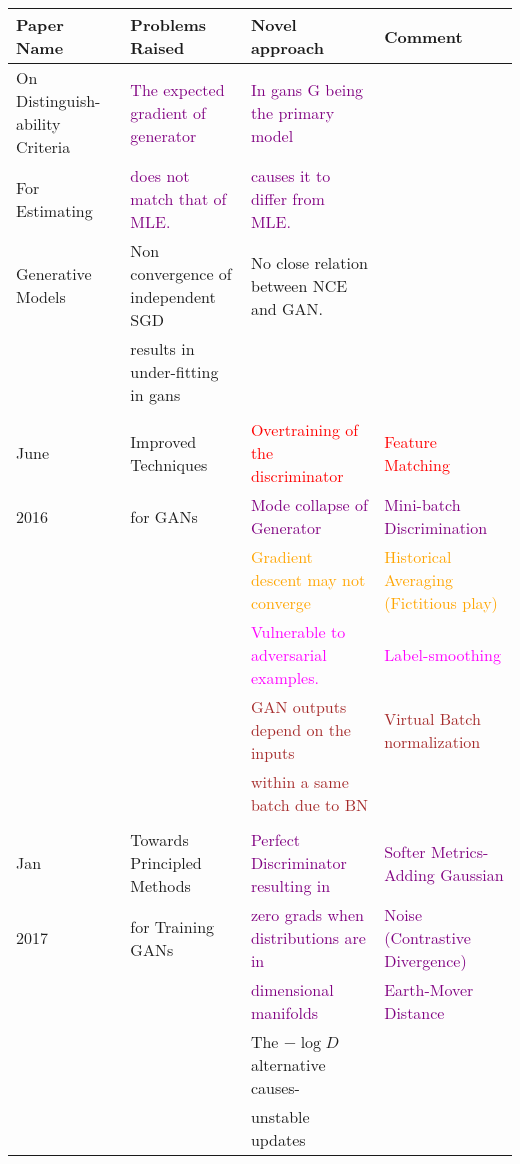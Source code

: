 \centering
\begin{adjustbox}{max width = 9cm}
\label{tab:2}
\begin{tabular}{|l|l|l|l|}
\hline 
 \textbf{Paper Name }& \textbf{Problems Raised} & \textbf{Novel approach} & \textbf{Comment} \\\hline
On Distinguish-ability Criteria & \textcolor{purple}{ The expected gradient of generator}  & \textcolor{purple}{In gans G being the primary model} &  \\
   For Estimating& \textcolor{purple}{does not  match that of MLE.}&\textcolor{purple}{causes it to differ from MLE.}& \\
Generative Models \cite{2014Goodfellow} & Non convergence of independent SGD& No close relation between NCE and GAN.& \\
&results in under-fitting in gans& &\\
&&& \\
June & Improved Techniques  & \textcolor{red}{Overtraining of the discriminator}  & \textcolor{red}{Feature Matching}  \\
2016 &for GANs \cite{goodfellow16} &\textcolor{purple}{Mode collapse of Generator} & \textcolor{purple}{Mini-batch Discrimination} \\
&& \textcolor{orange}{Gradient descent may not converge} & \textcolor{orange}{Historical Averaging (Fictitious play)}\\
& & \textcolor{magenta}{Vulnerable to adversarial examples.} & \textcolor{magenta}{Label-smoothing} \\
&&\textcolor{brown}{GAN outputs depend on the inputs} & \textcolor{brown}{Virtual Batch normalization} \\
&& \textcolor{brown}{within a same batch due to BN} &\\
& & & \\
Jan& Towards Principled Methods & \textcolor{purple}{Perfect Discriminator resulting in} & \textcolor{purple}{Softer Metrics- Adding Gaussian}\\
2017 &for Training GANs \cite{arjovsky01} & \textcolor{purple}{zero grads when distributions are  in} & \textcolor{purple}{Noise (Contrastive Divergence)} \\
&&\textcolor{purple}{dimensional manifolds}& \textcolor{purple}{Earth-Mover Distance}\\
&&The $-\log D$ alternative causes-  & \\
&&unstable updates& \\

\end{tabular}
\end{adjustbox}
